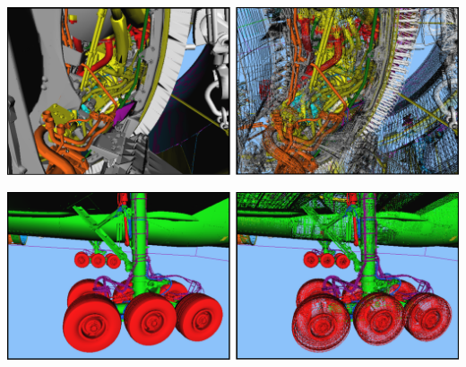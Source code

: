 \begin{Bild}
\includegraphics[scale=0.40]{images/turbine_innen2.pdf}
\end{Bild}

\begin{Bild}
\includegraphics[scale=0.40]{images/fahrwerk.pdf}
\end{Bild}

%
%
